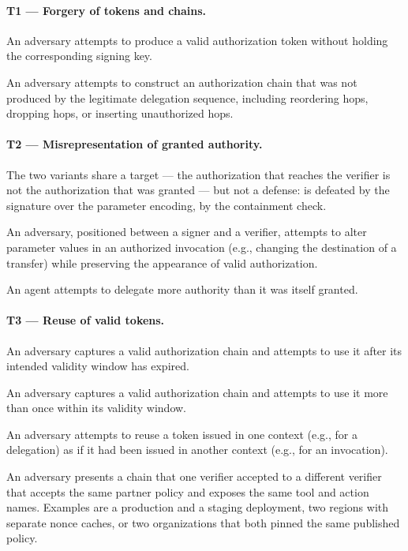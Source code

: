 \documentclass[11pt,a4paper]{article}
\begin{document}
\paragraph{T1 --- Forgery of tokens and chains.}

 An adversary attempts to produce a valid
authorization token without holding the corresponding signing key.

 An adversary attempts to
construct an authorization chain that was not produced by the legitimate
delegation sequence, including reordering hops, dropping hops, or
inserting unauthorized hops.

\paragraph{T2 --- Misrepresentation of granted authority.}
The two variants share a target --- the authorization that reaches the
verifier is not the authorization that was granted --- but not a
defense:  is defeated by the signature over the parameter
encoding,  by the containment check.

 An adversary, positioned between a
signer and a verifier, attempts to alter parameter values in an
authorized invocation (e.g., changing the destination of a transfer)
while preserving the appearance of valid authorization.

 An agent attempts to delegate more
authority than it was itself granted.

\paragraph{T3 --- Reuse of valid tokens.}

 An adversary captures a valid
authorization chain and attempts to use it after its intended validity
window has expired.

 An adversary captures a
valid authorization chain and attempts to use it more than once within
its validity window.

 An adversary attempts to reuse a
token issued in one context (e.g., for a delegation) as if it had been
issued in another context (e.g., for an invocation).

 An adversary presents a chain that
one verifier accepted to a different verifier that accepts the same
partner policy and exposes the same tool and action names. Examples are
a production and a staging deployment, two regions with separate nonce
caches, or two organizations that both pinned the same published
policy.
\end{document}
